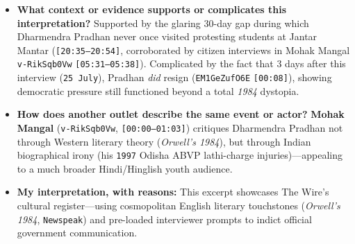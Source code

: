 \documentclass[10pt,a4paper]{article}
\begin{document}
\begin{itemize}[leftmargin=1.5em, itemsep=3pt, topsep=4pt]
  \item \textbf{What context or evidence supports or complicates this interpretation?} Supported by the glaring 30-day gap during which Dharmendra Pradhan never once visited protesting students at Jantar Mantar (\texttt{[20:35--20:54]}, corroborated by citizen interviews in Mohak Mangal \texttt{v-RikSqb0Vw} \texttt{[05:31--05:38]}). Complicated by the fact that 3 days after this interview (\texttt{25 July}), Pradhan \textit{did} resign (\texttt{EM1GeZufO6E} \texttt{[00:08]}), showing democratic pressure still functioned beyond a total \textit{1984} dystopia.
  \item \textbf{How does another outlet describe the same event or actor?} \textbf{Mohak Mangal} (\texttt{v-RikSqb0Vw}, \texttt{[00:00--01:03]}) critiques Dharmendra Pradhan not through Western literary theory (\textit{Orwell's 1984}), but through Indian biographical irony (his \texttt{1997} Odisha ABVP lathi-charge injuries)---appealing to a much broader Hindi/Hinglish youth audience.
  \item \textbf{My interpretation, with reasons:} This excerpt showcases The Wire's cultural register---using cosmopolitan English literary touchstones (\textit{Orwell's 1984}, \texttt{Newspeak}) and pre-loaded interviewer prompts to indict official government communication.
\end{itemize}
\end{document}
